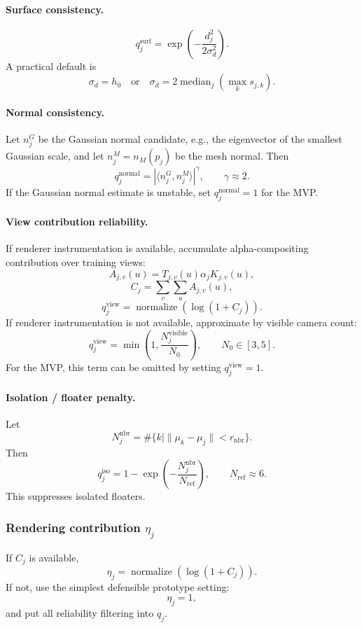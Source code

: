 \documentclass[11pt,a4paper]{article}
\newcommand{\normalize}{\operatorname{normalize}}
\begin{document}
\paragraph{Surface consistency.}
\[
q_j^{\mathrm{surf}}=\exp\left(-\frac{d_j^2}{2\sigma_d^2}\right).
\]
A practical default is
\[
\sigma_d=h_0
\quad\text{or}\quad
\sigma_d=2\operatorname{median}_j(\max_k s_{j,k}).
\]

\paragraph{Normal consistency.}
Let $n_j^G$ be the Gaussian normal candidate, e.g., the eigenvector of the smallest Gaussian scale, and let $n_j^M=n_M(p_j)$ be the mesh normal. Then
\[
q_j^{\mathrm{normal}}=|\langle n_j^G,n_j^M\rangle|^\gamma,
\qquad \gamma\approx 2.
\]
If the Gaussian normal estimate is unstable, set $q_j^{\mathrm{normal}}=1$ for the MVP.

\paragraph{View contribution reliability.}
If renderer instrumentation is available, accumulate alpha-compositing contribution over training views:
\[
A_{j,v}(u)=T_{j,v}(u)\alpha_jK_{j,v}(u),
\]
\[
C_j=\sum_v\sum_u A_{j,v}(u),
\]
\[
q_j^{\mathrm{view}}=\normalize\left(\log(1+C_j)\right).
\]
If renderer instrumentation is not available, approximate by visible camera count:
\[
q_j^{\mathrm{view}}=\min\left(1,\frac{N_j^{\mathrm{visible}}}{N_0}\right),
\qquad N_0\in[3,5].
\]
For the MVP, this term can be omitted by setting $q_j^{\mathrm{view}}=1$.

\paragraph{Isolation / floater penalty.}
Let
\[
N_j^{\mathrm{nbr}}=\#\{k\mid \|\mu_k-\mu_j\|<r_{\mathrm{nbr}}\}.
\]
Then
\[
q_j^{\mathrm{iso}}=1-\exp\left(-\frac{N_j^{\mathrm{nbr}}}{N_{\mathrm{ref}}}\right),
\qquad N_{\mathrm{ref}}\approx 6.
\]
This suppresses isolated floaters.

\subsubsection{Rendering contribution $\eta_j$}

If $C_j$ is available,
\[
\eta_j=\normalize(\log(1+C_j)).
\]
If not, use the simplest defensible prototype setting:
\[
\eta_j=1,
\]
and put all reliability filtering into $q_j$.
\end{document}
